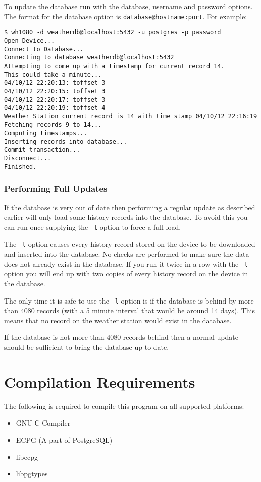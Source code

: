 \documentclass[a4paper,10pt,draft]{book}
\begin{document}
To update the database run with the database, username and password options. The format for the database option is \verb|database@hostname:port|. For example:
\begin{verbatim}
$ wh1080 -d weatherdb@localhost:5432 -u postgres -p password
Open Device...
Connect to Database...
Connecting to database weatherdb@localhost:5432
Attempting to come up with a timestamp for current record 14.
This could take a minute...
04/10/12 22:20:13: toffset 3
04/10/12 22:20:15: toffset 3
04/10/12 22:20:17: toffset 3
04/10/12 22:20:19: toffset 4
Weather Station current record is 14 with time stamp 04/10/12 22:16:19
Fetching records 9 to 14...
Computing timestamps...
Inserting records into database...
Commit transaction...
Disconnect...
Finished.
\end{verbatim}

\subsubsection{Performing Full Updates}
If the database is very out of date then performing a regular update as described earlier will only load some history records into the database. To avoid this you can run once supplying the \verb|-l| option to force a full load.

The \verb|-l| option causes every history record stored on the device to be downloaded and inserted into the database. No checks are performed to make sure the data does not already exist in the database. If you run it twice in a row with the \verb|-l| option you will end up with two copies of every history record on the device in the database.

The only time it is safe to use the \verb|-l| option is if the database is behind by more than 4080 records (with a 5 minute interval that would be around 14 days). This means that no record on the weather station would exist in the database.

If the database is not more than 4080 records behind then a normal update should be sufficient to bring the database up-to-date.

\section{Compilation Requirements}
The following is required to compile this program on all supported platforms:
\begin{itemize}
\item GNU C Compiler
\item ECPG (A part of PostgreSQL)
\item libecpg
\item libpgtypes
\end{itemize}
\end{document}

